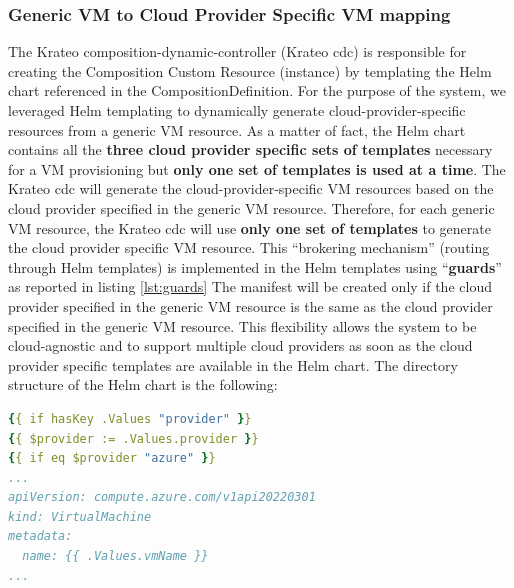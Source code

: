 \subsubsection{Generic VM to Cloud Provider Specific VM mapping}

The Krateo composition-dynamic-controller (Krateo cdc) is responsible for creating the Composition Custom Resource (instance) by templating the Helm chart referenced in the CompositionDefinition.
For the purpose of the system, we leveraged Helm templating to dynamically generate cloud-provider-specific resources from a generic VM resource.
As a matter of fact, the Helm chart contains all the \textbf{three cloud provider specific sets of templates} necessary for a VM provisioning but \textbf{only one set of templates is used at a time}.
The Krateo cdc will generate the cloud-provider-specific VM resources based on the cloud provider specified in the generic VM resource.
Therefore, for each generic VM resource, the Krateo cdc will use \textbf{only one set of templates} to generate the cloud provider specific VM resource.
This ``brokering mechanism'' (routing through Helm templates) is implemented in the Helm templates using ``\textbf{guards}'' as reported in listing \ref{lst:guards}
The manifest will be created only if the cloud provider specified in the generic VM resource is the same as the cloud provider specified in the generic VM resource.
This flexibility allows the system to be cloud-agnostic and to support multiple cloud providers as soon as the cloud provider specific templates are available in the Helm chart.
The directory structure of the Helm chart is the following:

\vspace{0.5cm}


\vspace{0.5cm}

\begin{lstlisting}[language=yaml, caption={Helm Template guards example}, label={lst:guards}]
{{ if hasKey .Values "provider" }}
{{ $provider := .Values.provider }}
{{ if eq $provider "azure" }}
...
apiVersion: compute.azure.com/v1api20220301
kind: VirtualMachine
metadata:
  name: {{ .Values.vmName }}
...
\end{lstlisting}


